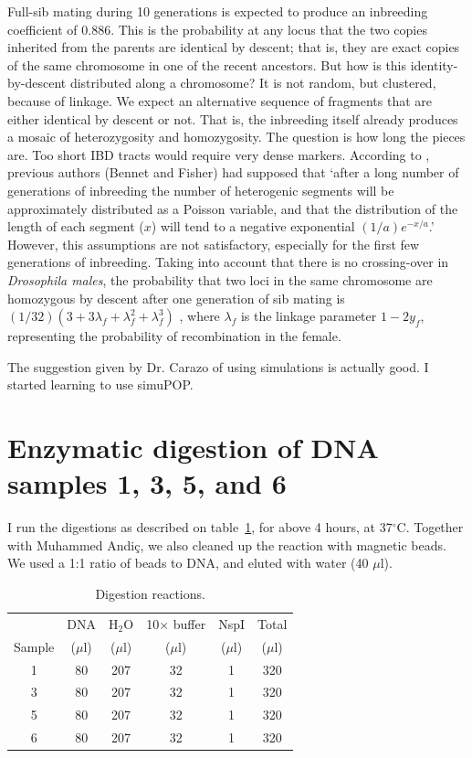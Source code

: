 \documentclass[a4paper,12pt]{article}
\begin{document}
Full-sib mating during 10 generations is expected to produce an inbreeding coefficient of 0.886. This is the probability at any locus that the two copies inherited from the parents are identical by descent; that is, they are exact copies of the same chromosome in one of the recent ancestors. But how is this identity-by-descent distributed along a chromosome? It is not random, but clustered, because of linkage. We expect an alternative sequence of fragments that are either identical by descent or not. That is, the inbreeding itself already produces a mosaic of heterozygosity and homozygosity. The question is how long the pieces are. Too short IBD tracts would require very dense markers. According to \citet{Franklin1977}, previous authors (Bennet and Fisher) had supposed that `after a long number of generations of inbreeding the number of heterogenic segments will be approximately distributed as a Poisson variable, and that the distribution of the length of each segment ($x$) will tend to a negative exponential $(1/a)e^{-x/a}$.' However, this assumptions are not satisfactory, especially for the first few generations of inbreeding. Taking into account that there is no crossing-over in \emph{Drosophila males}, the probability that two loci in the same chromosome are homozygous by descent after one generation of sib mating is $(1/32)(3 + 3\lambda_f + \lambda^2_f + \lambda^3_f)$ \citep{Franklin1977}, where $\lambda_f$ is the linkage parameter $1-2y_f$, representing the probability of recombination in the female.

The suggestion given by Dr. Carazo of using simulations is actually good. I started learning to use simuPOP.

\section{Enzymatic digestion of DNA samples 1, 3, 5, and 6}
I run the digestions as described on table~\ref{tau:digestion}, for above 4 hours, at 37$^\circ$C. Together with Muhammed Andiç, we also cleaned up the reaction with magnetic beads. We used a 1:1 ratio of beads to DNA, and eluted with water (40 $\mu$l). 

\begin{table}
\begin{center}
\caption{Digestion reactions.}\label{tau:digestion}
\vspace*{0.3cm}
\begin{tabular}{cccccc}
\toprule
      &DNA&H$_2$O&10$\times$ buffer&NspI&Total\\
Sample&($\mu$l)&($\mu$l)&($\mu$l)&($\mu$l)&($\mu$l)\\
\midrule
1&80&207&32&1&320\\
3&80&207&32&1&320\\
5&80&207&32&1&320\\
6&80&207&32&1&320\\
\bottomrule
\end{tabular}
\end{center}
\end{table}
\end{document}
